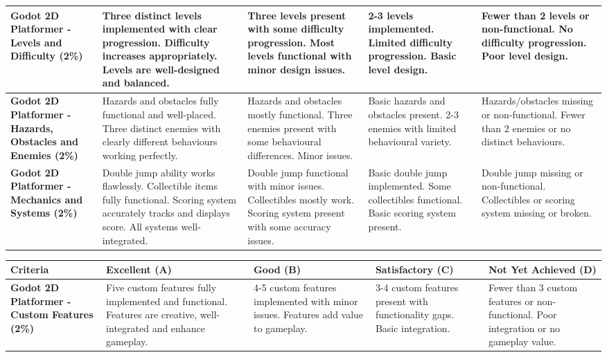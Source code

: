 \documentclass{article}
\begin{document}
\begin{landscape}
\begin{tabular}{|p{5cm}|p{4cm}|p{4cm}|p{4cm}|p{4cm}|}
\textbf{Godot 2D Platformer - Levels and Difficulty (2\%)} & 
Three distinct levels implemented with clear progression. Difficulty increases appropriately. Levels are well-designed and balanced. & 
Three levels present with some difficulty progression. Most levels functional with minor design issues. & 
2-3 levels implemented. Limited difficulty progression. Basic level design. & 
Fewer than 2 levels or non-functional. No difficulty progression. Poor level design. \\ \hline

\textbf{Godot 2D Platformer - Hazards, Obstacles and Enemies (2\%)} & 
Hazards and obstacles fully functional and well-placed. Three distinct enemies with clearly different behaviours working perfectly. & 
Hazards and obstacles mostly functional. Three enemies present with some behavioural differences. Minor issues. & 
Basic hazards and obstacles present. 2-3 enemies with limited behavioural variety. & 
Hazards/obstacles missing or non-functional. Fewer than 2 enemies or no distinct behaviours. \\ \hline

\textbf{Godot 2D Platformer - Mechanics and Systems (2\%)} & 
Double jump ability works flawlessly. Collectible items fully functional. Scoring system accurately tracks and displays score. All systems well-integrated. & 
Double jump functional with minor issues. Collectibles mostly work. Scoring system present with some accuracy issues. & 
Basic double jump implemented. Some collectibles functional. Basic scoring system present. & 
Double jump missing or non-functional. Collectibles or scoring system missing or broken. \\ \hline

\end{tabular}

\begin{tabular}{|p{5cm}|p{4cm}|p{4cm}|p{4cm}|p{4cm}|}
\hline
\textbf{Criteria} & \textbf{Excellent (A)} & \textbf{Good (B)} & \textbf{Satisfactory (C)} & \textbf{Not Yet Achieved (D)} \\ \hline

\textbf{Godot 2D Platformer - Custom Features (2\%)} & 
Five custom features fully implemented and functional. Features are creative, well-integrated and enhance gameplay. & 
4-5 custom features implemented with minor issues. Features add value to gameplay. & 
3-4 custom features present with functionality gaps. Basic integration. & 
Fewer than 3 custom features or non-functional. Poor integration or no gameplay value. \\ \hline


\end{tabular}
\end{landscape}
\end{document}
